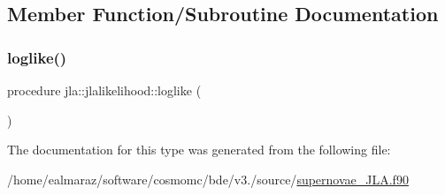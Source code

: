 \subsection{Member Function/\+Subroutine Documentation}
\mbox{\label{structjla_1_1jlalikelihood_a273fcb9a25e2c19605339ff00b974d9d}} 
\subsubsection{\texorpdfstring{loglike()}{loglike()}}
{\footnotesize\ttfamily procedure jla\+::jlalikelihood\+::loglike (\begin{DoxyParamCaption}{ }\end{DoxyParamCaption})}



The documentation for this type was generated from the following file\+:\begin{DoxyCompactItemize}
\item 
/home/ealmaraz/software/cosmomc/bde/v3./source/\mbox{\hyperlink{supernovae__JLA_8f90}{supernovae\+\_\+\+J\+L\+A.\+f90}}\end{DoxyCompactItemize}
